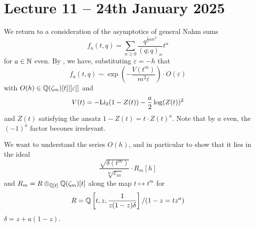 \section{Lecture 11 -- 24th January 2025}\label{sec: lecture 11}
We return to a consideration of the asymptotics of general Nahm sums 
$$f_{a}(t,q)=\sum_{n\geq0}\frac{q^{\frac{1}{2}an^{2}}}{(q;q)_{n}}t^{n}$$
for $a\in\mathbb{N}$ even. By , we have, substituting $\varepsilon=-h$ that 
$$f_{a}(t,q)\sim \exp\left(-\frac{V(t^{m})}{m^{2}\varepsilon}\right)\cdot O(\varepsilon)$$
with $O(h)\in\mathbb{Q}(\zeta_{m})[t][[\varepsilon]]$ and
$$V(t)=-\mathrm{Li}_{2}(1-Z(t))-\frac{a}{2}\log(Z(t))^{2}$$
and $Z(t)$ satisfying the ansatz $1-Z(t)=t\cdot Z(t)^{a}$. Note that by $a$ even, the $(-1)^{a}$ factor becones irrelevant. 

We want to understand the series $O(h)$, and in particular to show that it lies in the ideal
$$\frac{\sqrt{\delta(t^{m})}}{\sqrt[m]{\varepsilon_{m}}}\cdot R_{m}[h]$$
and $R_{m}= R\otimes_{\mathbb{Q}[t]}\mathbb{Q}(\zeta_{m})[t]$ along the map $t\mapsto t^{m}$ for 
$$R=\mathbb{Q}\left[t,z,\frac{1}{z(1-z)\delta}\right]/(1-z=tz^{a})$$
$\delta=z+a(1-z)$. 

